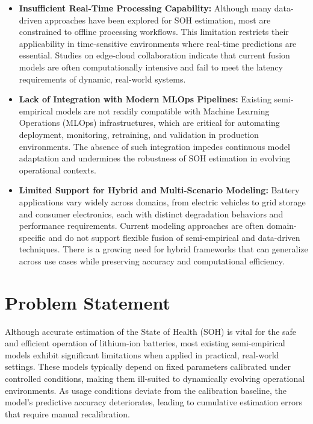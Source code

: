\begin{itemize}
    \item \textbf{Insufficient Real-Time Processing Capability:} Although many data-driven approaches have been explored for SOH estimation, most are constrained to offline processing workflows. This limitation restricts their applicability in time-sensitive environments where real-time predictions are essential. Studies on edge-cloud collaboration indicate that current fusion models are often computationally intensive and fail to meet the latency requirements of dynamic, real-world systems.
    
    \item \textbf{Lack of Integration with Modern MLOps Pipelines:} Existing semi-empirical models are not readily compatible with Machine Learning Operations (MLOps) infrastructures, which are critical for automating deployment, monitoring, retraining, and validation in production environments. The absence of such integration impedes continuous model adaptation and undermines the robustness of SOH estimation in evolving operational contexts.
    
    \item \textbf{Limited Support for Hybrid and Multi-Scenario Modeling:} Battery applications vary widely across domains, from electric vehicles to grid storage and consumer electronics, each with distinct degradation behaviors and performance requirements. Current modeling approaches are often domain-specific and do not support flexible fusion of semi-empirical and data-driven techniques. There is a growing need for hybrid frameworks that can generalize across use cases while preserving accuracy and computational efficiency.
\end{itemize}


\section{Problem Statement}

Although accurate estimation of the State of Health (SOH) is vital for the safe and efficient operation of lithium-ion batteries, most existing semi-empirical models exhibit significant limitations when applied in practical, real-world settings. These models typically depend on fixed parameters calibrated under controlled conditions, making them ill-suited to dynamically evolving operational environments. As usage conditions deviate from the calibration baseline, the model's predictive accuracy deteriorates, leading to cumulative estimation errors that require manual recalibration.


